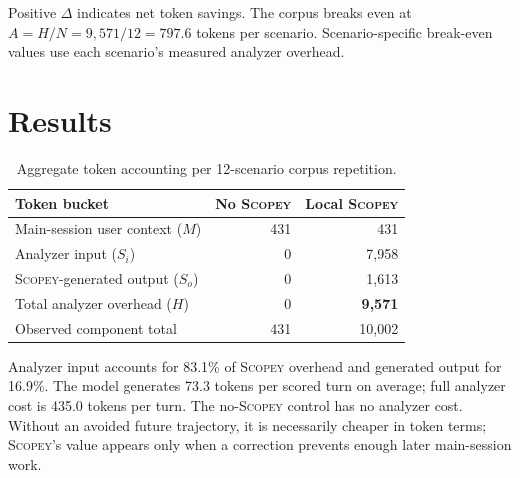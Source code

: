 \documentclass[10pt]{article}
\newcommand{\scopey}{\textsc{Scopey}\xspace}
\newcommand{\result}[1]{\textcolor{scopeblue}{\textbf{#1}}}
\begin{document}
Positive $\Delta$ indicates net token savings. The corpus breaks even at
$A=H/N=9{,}571/12=797.6$ tokens per scenario. Scenario-specific break-even
values use each scenario's measured analyzer overhead.

\section{Results}

\begin{table}[ht]
\centering
\caption{Aggregate token accounting per 12-scenario corpus repetition.}
\label{tab:aggregate}
\begin{tabular}{lrr}
\toprule
Token bucket & No \scopey & Local \scopey \\
\midrule
Main-session user context ($M$) & 431 & 431 \\
Analyzer input ($S_i$) & 0 & 7,958 \\
\scopey-generated output ($S_o$) & 0 & 1,613 \\
Total analyzer overhead ($H$) & 0 & \result{9,571} \\
Observed component total & 431 & 10,002 \\
\bottomrule
\end{tabular}
\end{table}

Analyzer input accounts for 83.1\% of \scopey overhead and generated output for
16.9\%. The model generates 73.3 tokens per scored turn on average; full
analyzer cost is 435.0 tokens per turn. The no-\scopey control has no analyzer
cost. Without an avoided future trajectory, it is necessarily cheaper in token
terms; \scopey's value appears only when a correction prevents enough later
main-session work.
\end{document}
